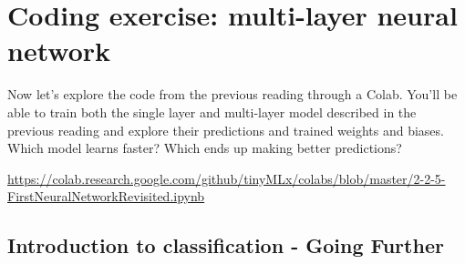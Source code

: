 \section{Coding exercise: multi-layer neural network}

Now let's explore the code from the previous reading through a Colab. You’ll be able to train both the single layer and multi-layer model described in the previous reading and explore their predictions and trained weights and biases. Which model learns faster? Which ends up making better predictions?

\url{https://colab.research.google.com/github/tinyMLx/colabs/blob/master/2-2-5-FirstNeuralNetworkRevisited.ipynb}


\subsection{Introduction to classification - Going Further}


